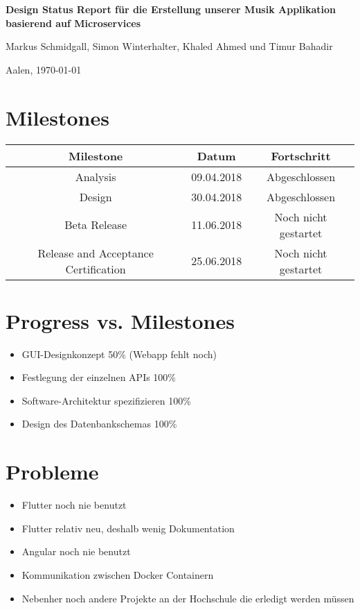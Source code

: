 \documentclass[a4paper, 12pt]{scrartcl} %
\author{Markus Schmidgall}
\date{\today}
\begin{document}
	\centering
	{\huge\bfseries Design Status Report für die Erstellung unserer Musik Applikation basierend auf Microservices \par}
	\vspace{4cm}
Markus Schmidgall, Simon Winterhalter, Khaled Ahmed und Timur Bahadir
\vspace{0.2cm}

	Aalen, \today\par

\vspace{3cm}

\section*{Milestones}

\begin{table}[h]
\begin{tabular}{|c|c|c|}
\hline
Milestone                            & Datum      & Fortschritt          \\ \hline
Analysis                             & 09.04.2018 & Abgeschlossen        \\ \hline
Design                               & 30.04.2018 & Abgeschlossen        \\ \hline
Beta Release                         & 11.06.2018 & Noch nicht gestartet \\ \hline
Release and Acceptance Certification & 25.06.2018 & Noch nicht gestartet \\ \hline
\end{tabular}
\end{table}

\section*{Progress vs. Milestones}
\begin{itemize}
\item GUI-Designkonzept 50\% (Webapp fehlt noch)
\item Festlegung der einzelnen APIs 100\%
\item Software-Architektur spezifizieren 100\%
\item Design des Datenbankschemas 100\%
\end{itemize}
\section*{Probleme}
\begin{itemize}
\item Flutter noch nie benutzt
\item Flutter relativ neu, deshalb wenig Dokumentation
\item Angular noch nie benutzt
\item Kommunikation zwischen Docker Containern
\item Nebenher noch andere Projekte an der Hochschule die erledigt werden müssen
\end{itemize}
\end{document}
